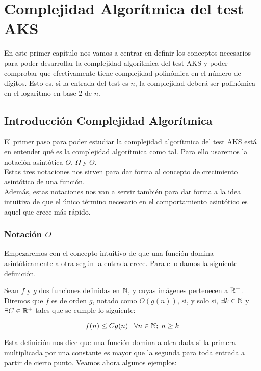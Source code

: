 \chapter{Complejidad Algorítmica del test AKS}

En este primer capítulo nos vamos a centrar en definir los conceptos necesarios para poder desarrollar la complejidad algorítmica del test AKS y poder comprobar que efectivamente tiene complejidad polinómica en el número de dígitos. Esto es, si la entrada del test es $n$, la complejidad deberá ser polinómica en el logaritmo en base 2 de $n$.

\section{Introducción Complejidad Algorítmica}

El primer paso para poder estudiar la complejidad algorítmica del test AKS está en entender qué es la complejidad algorítmica como tal. Para ello usaremos la notación asintótica $O$, $\Omega$ y $\Theta$.\\

Estas tres notaciones nos sirven para dar forma al concepto de crecimiento asintótico de una función.\\

Además, estas notaciones nos van a servir también para dar forma a la idea intuitiva de que el único término necesario en el comportamiento asintótico es aquel que crece más rápido.

\subsection{Notación $O$}

Empezaremos con el concepto intuitivo de que una función domina asintóticamente a otra según la entrada crece. Para ello damos la siguiente definición.

\begin{definicion}
	Sean $f$ y $g$ dos funciones definidas en $\mathbb{N}$, y cuyas imágenes pertenecen a $\mathbb{R}^+$. Diremos que $f$ es de orden $g$, notado como $O(g(n))$, si, y solo si, $\exists k \in \mathbb{N}$ y $\exists C \in \mathbb{R}^+$ tales que se cumple lo siguiente:
	
	$$f(n) \leq Cg(n) \;\;\;\forall n \in \mathbb{N};\; n \geq k$$
\end{definicion}

Esta definición nos dice que una función domina a otra dada si la primera multiplicada por una constante es mayor que la segunda para toda entrada a partir de cierto punto. Veamos ahora algunos ejemplos:

